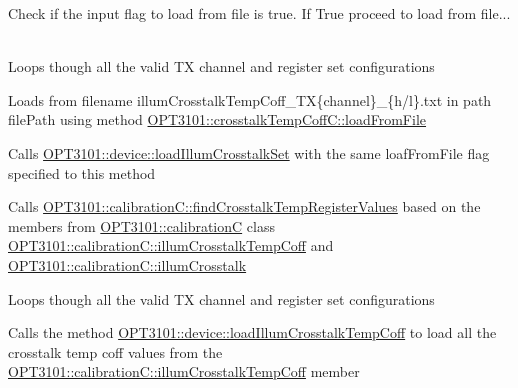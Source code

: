 \begin{DoxyItemize}
\item Check if the input flag to load from file is true. If True proceed to load from file... ~\newline
~\newline
~\newline
~\newline
~\newline
~\newline

\item Loops though all the valid TX channel and register set configurations
\item Loads from filename illum\+Crosstalk\+Temp\+Coff\+\_\+\+TX\{channel\}\+\_\+\{h/l\}.txt in path file\+Path using method \mbox{\hyperlink{class_o_p_t3101_1_1crosstalk_temp_coff_c_ae7028582197d0c77e9cf990dab888f1e}{O\+P\+T3101\+::crosstalk\+Temp\+Coff\+C\+::load\+From\+File}}
\item Calls \mbox{\hyperlink{class_o_p_t3101_1_1device_a48b320dfe4376bf62043d10ba937e8cd}{O\+P\+T3101\+::device\+::load\+Illum\+Crosstalk\+Set}} with the same loaf\+From\+File flag specified to this method ~\newline
~\newline
~\newline

\item Calls \mbox{\hyperlink{class_o_p_t3101_1_1calibration_c_ac133c41d60c71559a224a86bc3e62c3a}{O\+P\+T3101\+::calibration\+C\+::find\+Crosstalk\+Temp\+Register\+Values}} based on the members from \mbox{\hyperlink{class_o_p_t3101_1_1calibration_c}{O\+P\+T3101\+::calibrationC}} class \mbox{\hyperlink{class_o_p_t3101_1_1calibration_c_ac7bcc22317965bb378479fb016c20d3c}{O\+P\+T3101\+::calibration\+C\+::illum\+Crosstalk\+Temp\+Coff}} and \mbox{\hyperlink{class_o_p_t3101_1_1calibration_c_ac09121c7057093506de63d6e2ea3a4b7}{O\+P\+T3101\+::calibration\+C\+::illum\+Crosstalk}}
\item Loops though all the valid TX channel and register set configurations
\item Calls the method \mbox{\hyperlink{class_o_p_t3101_1_1device_a450bc6b5bcd3e6b232d4352229a2829c}{O\+P\+T3101\+::device\+::load\+Illum\+Crosstalk\+Temp\+Coff}} to load all the crosstalk temp coff values from the \mbox{\hyperlink{class_o_p_t3101_1_1calibration_c_ac7bcc22317965bb378479fb016c20d3c}{O\+P\+T3101\+::calibration\+C\+::illum\+Crosstalk\+Temp\+Coff}} member 
\end{DoxyItemize}\mbox{\label{class_o_p_t3101_1_1device_aa34206319a66be86de29789a1c24e3f7}} 
